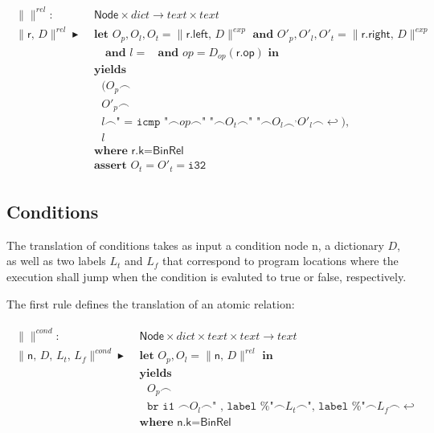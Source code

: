\documentclass{article}
\newcommand{\trad}[2]{\ensuremath{\lVert \textsf{#1} \rVert^{\textit{#2}}}}
\newcommand{\nl}[0]{\ensuremath{\hookleftarrow}}
\DeclareMathOperator{\conc}{\smallfrown}
\DeclareMathOperator{\isdef}{\blacktriangleright}
\DeclareMathOperator{\name}{\mathcal{L}()}
\begin{document}
\begin{framed}
\begin{align}
\begin{split}
 \trad{}{rel} : & \textsf{ Node} \times dict  \rightarrow text \times text \\
  \trad{r, $D$}{rel} \isdef & \textbf{ let } O_p, O_l, O_t =
  \trad{r.left, $D$}{exp} \textbf{ and }
  O'_p, O'_l, O'_t = \trad{r.right, $D$}{exp} \\
  & \quad \textbf{ and } l = \name \textbf{ and } op = D_{op}(\textsf{r.op}) \textbf{ in } \\
  & \textbf{ yields} \\
  & \quad (O_p \conc \\
  & \quad O'_p \conc \\
  & \quad l \conc \texttt{" = icmp "} \conc op \conc \texttt{" "} \conc O_t \conc \texttt{" "} \conc O_l \conc^, O'_l \conc \nl), \\
  & \quad l \\
  & \textbf{ where } \textsf{r.k} = \textsf{BinRel} \\
  & \textbf{ assert } O_t = O'_t = \texttt{i32}
\end{split}
\end{align}
\end{framed}
   
\subsection{Conditions}
\label{sec:cond}

The translation of conditions takes as input a condition node
\textsf{n}, a dictionary $D$, as well as two labels $L_t$ and $L_f$
that correspond to program locations where the execution shall jump
when the condition is evaluted to true or false, respectively.

The first rule defines the translation of an atomic relation:
\begin{framed}
\begin{align}
\begin{split}
  \trad{}{cond} : & \textsf{ Node} \times dict \times text \times text \rightarrow text \\
  \trad{n, $D$, $L_t$, $L_f$}{cond} \isdef
  & \textbf{ let } O_p, O_l = \trad{n, $D$}{rel} \textbf{ in } \\
  & \textbf{ yields} \\
  & \quad O_p \conc \\
  & \quad \texttt{br i1 } \conc O_l \conc \texttt{" , label \%"} \conc L_t \conc \texttt{", label \%"} \conc L_f \conc \nl  \\
  & \textbf{ where } \textsf{n.k} = \textsf{BinRel}
\end{split}
\end{align}
\end{framed}
\end{document}
